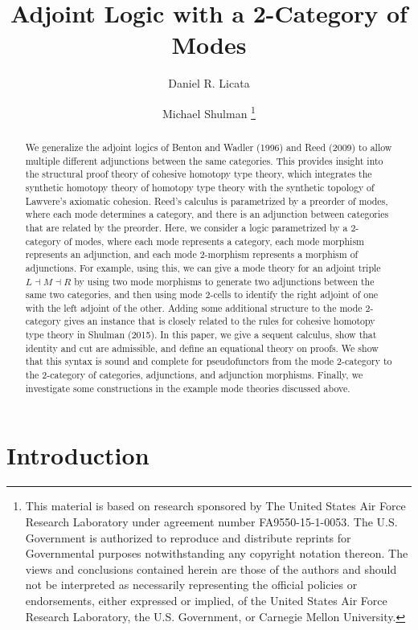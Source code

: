 \documentclass{drl-common/llncs}
\title{Adjoint Logic with a 2-Category of Modes}
\author{Daniel R. Licata\inst{1} \and Michael Shulman\inst{2}
\thanks{
This material is based on research sponsored by The United States Air
Force Research Laboratory under agreement number FA9550-15-1-0053. The
U.S. Government is authorized to reproduce and distribute reprints for
Governmental purposes notwithstanding any copyright notation thereon.
The views and conclusions contained herein are those of the authors and
should not be interpreted as necessarily representing the official
policies or endorsements, either expressed or implied, of the United
States Air Force Research Laboratory, the U.S. Government, or Carnegie
Mellon University.
}}
\institute{Wesleyan University \and University of San Diego}
\newcommand{\la}{\ensuremath{\dashv}}
\begin{document}
\maketitle

\begin{abstract}
We generalize the adjoint logics of Benton and Wadler (1996) and Reed
(2009) to allow multiple different adjunctions between the same
categories.  This provides insight into the structural proof theory of
cohesive homotopy type theory, which integrates the synthetic homotopy
theory of homotopy type theory with the synthetic topology of Lawvere's
axiomatic cohesion.  Reed's calculus is parametrized by a preorder of
modes, where each mode determines a category, and there is an adjunction
between categories that are related by the preorder.  Here, we consider
a logic parametrized by a 2-category of modes, where each mode
represents a category, each mode morphism represents an adjunction, and
each mode 2-morphism represents a morphism of adjunctions.  For example,
using this, we can give a mode theory for an adjoint triple $L \la M \la
R$ by using two mode morphisms to generate two adjunctions between the
same two categories, and then using mode 2-cells to identify the right
adjoint of one with the left adjoint of the other.  Adding some
additional structure to the mode 2-category gives an instance that is
closely related to the rules for cohesive homotopy type theory in
Shulman (2015).  In this paper, we give a sequent calculus, show that
identity and cut are admissible, and define an equational theory on
proofs.  We show that this syntax is sound and complete for
pseudofunctors from the mode 2-category to the 2-category of categories,
adjunctions, and adjunction morphisms.  Finally, we investigate some
constructions in the example mode theories discussed above.
\end{abstract}

\section{Introduction}
\end{document}
